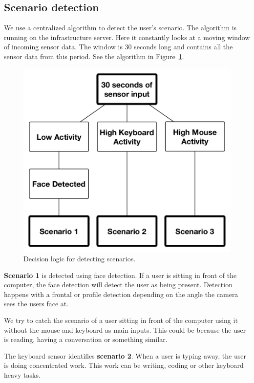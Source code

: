 \documentclass{sigchi}
\begin{document}
\subsection{Scenario detection}
\label{scenario_detection}
We use a centralized algorithm to detect the user's scenario.
The algorithm is running on the infrastructure server.
Here it constantly looks at a moving window of incoming sensor data.
The window is 30 seconds long and contains all the sensor data from this period.
See the algorithm in Figure~\ref{fig:decision_logic}.

\begin{figure}[H]
  \centering
  \includegraphics[width=\columnwidth]{figures/decision_logic.pdf}
  \caption{Decision logic for detecting scenarios.}
  \label{fig:decision_logic}
\end{figure}

\textbf{Scenario 1} is detected using face detection.
If a user is sitting in front of the computer, the face detection will detect the user as being present.
Detection happens with a frontal or profile detection depending on the angle the camera sees the users face at.

We try to catch the scenario of a user sitting in front of the computer using it without the mouse and keyboard as main inputs.
This could be because the user is reading, having a conversation or something similar.

The keyboard sensor identifies \textbf{scenario 2}.
When a user is typing away, the user is doing concentrated work.
This work can be writing, coding or other keyboard heavy tasks.
\end{document}
